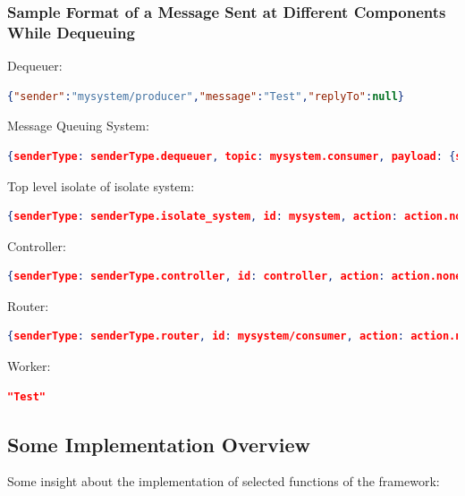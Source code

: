 \subsubsection{Sample Format of a Message Sent at Different Components While Dequeuing}
\begin{description}
\item Dequeuer:
\begin{lstlisting}[language=json,numbers=none]
{"sender":"mysystem/producer","message":"Test","replyTo":null}
\end{lstlisting}

\item Message Queuing System:
\begin{lstlisting}[language=json,numbers=none]
{senderType: senderType.dequeuer, topic: mysystem.consumer, payload: {sender: mysystem/producer, message: Test, replyTo: null}
\end{lstlisting}

\item Top level isolate of isolate system:
\begin{lstlisting}[language=json,numbers=none]
{senderType: senderType.isolate_system, id: mysystem, action: action.none, payload: {to: mysystem/consumer, message: {sender: mysystem/producer, message: Test, replyTo: null}}}
\end{lstlisting}

\item Controller:
\begin{lstlisting}[language=json,numbers=none]
{senderType: senderType.controller, id: controller, action: action.none, payload: {to: mysystem/consumer, message: {sender: mysystem/producer, message: Test, replyTo: null}}}
\end{lstlisting}

\item Router:
\begin{lstlisting}[language=json,numbers=none]
{senderType: senderType.router, id: mysystem/consumer, action: action.none, payload: {sender: mysystem/producer, message: Test, replyTo: null}}
\end{lstlisting}

\item Worker:
\begin{lstlisting}[language=json,numbers=none]
"Test"
\end{lstlisting}

\end{description}

\subsection{Some Implementation Overview}
\label{subsec:implementationOverview}
  Some insight about the implementation of selected functions of the framework:


